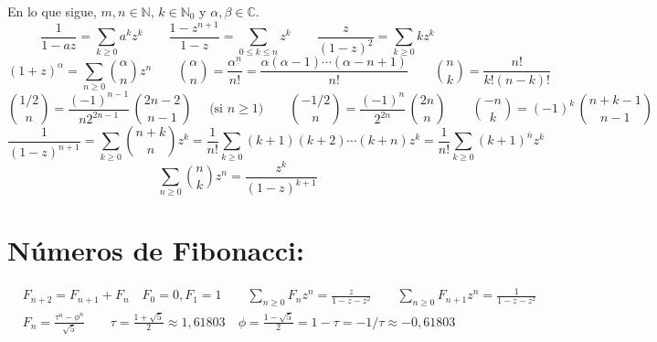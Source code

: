 \documentclass[english, spanish, fleqn]{article}
\begin{document}
  En lo que sigue,
  \(m, n \in \mathbb{N}\),
  \(k \in \mathbb{N}_0\)
  y \(\alpha, \beta \in \mathbb{C}\).
  \begin{equation*}
    \frac{1}{1 - a z}
      = \sum_{k \ge 0} a^k z^k
    \qquad
    \frac{1 - z^{n + 1}}{1 - z}
      = \sum_{0 \le k \le n} z^k
    \qquad
    \frac{z}{(1 - z)^2}
      = \sum_{k \ge 0} k z^k
  \end{equation*}
  \begin{equation*}
    (1 + z)^\alpha
      = \sum_{n \ge 0} \binom{\alpha}{n} z^n
	 \qquad \binom{\alpha}{n}
	     = \frac{\alpha^{\underline{n}}}{n!}
	     = \frac{\alpha (\alpha - 1) \dotsm (\alpha - n + 1)}{n!}
	 \qquad
    \binom{n}{k}
	     = \frac{n!}{k! (n - k)!}
  \end{equation*}
  \begin{equation*}
    \binom{1/2}{n}
      = \frac{(-1)^{n - 1}}{n 2^{2 n - 1}} \, \binom{2 n - 2}{n - 1}
	    \quad \text{\ (si \(n \ge 1\))}
      \qquad
    \binom{-1/2}{n}
      = \frac{(-1)^n}{2^{2 n}} \, \binom{2 n}{n} \qquad
    \binom{-n}{k}
      = (-1)^k \, \binom{n + k - 1}{n - 1}
  \end{equation*}
  \begin{equation*}
    \frac{1}{(1 - z)^{n + 1}}
      = \sum_{k \ge 0} \binom{n + k}{n} z^k
      = \frac{1}{n!}
	   \sum_{k \ge 0} (k + 1) (k + 2) \dotsm (k + n) z^k
      = \frac{1}{n!} \sum_{k \ge 0} (k + 1)^{\bar{n}} z^k
  \end{equation*}
  \begin{equation*}
    \sum_{n \ge 0} \binom{n}{k} z^n
      = \frac{z^k}{(1 - z)^{k + 1}}
  \end{equation*}
\section*{Números de Fibonacci:}

  \begin{align*}
    &F_{n + 2} = F_{n + 1} + F_n \quad F_0 = 0, F_1 = 1
      \qquad \sum_{n \ge 0} F_n z^n = \frac{z}{1 - z - z^2}
      \qquad \sum_{n \ge 0} F_{n + 1} z^n = \frac{1}{1 - z - z^2} \\
    &F_n = \frac{\tau^n - \phi^n}{\sqrt{5}}
      \qquad
      \tau = \frac{1 + \sqrt{5}}{2} \approx 1,61803
      \quad \phi = \frac{1 - \sqrt{5}}{2}
                 = 1 - \tau = -1 / \tau \approx -0,61803
  \end{align*}
\end{document}
